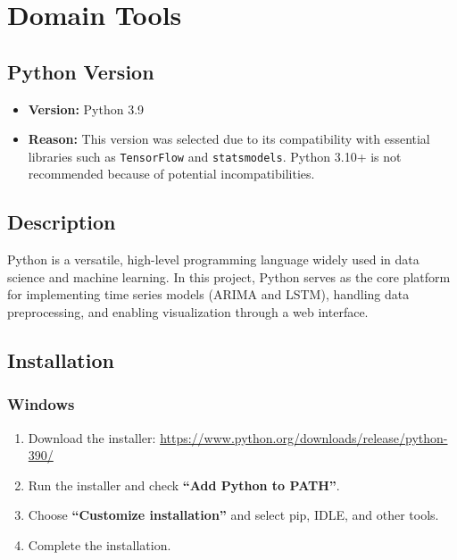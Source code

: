 %
%

\chapter{Domain Tools}

\section{Python Version}

\begin{itemize}
	\item \textbf{Version:} Python 3.9
	\item \textbf{Reason:} This version was selected due to its compatibility with essential libraries such as \texttt{TensorFlow} and \texttt{statsmodels}. Python 3.10+ is not recommended because of potential incompatibilities.
\end{itemize}

\section{Description}

Python is a versatile, high-level programming language widely used in data science and machine learning. In this project, Python serves as the core platform for implementing time series models (ARIMA and LSTM), handling data preprocessing, and enabling visualization through a web interface.

\section{Installation}

\subsection*{Windows}

\begin{enumerate}
	\item Download the installer: \url{https://www.python.org/downloads/release/python-390/}
	\item Run the installer and check \textbf{``Add Python to PATH''}.
	\item Choose \textbf{``Customize installation''} and select pip, IDLE, and other tools.
	\item Complete the installation.
\end{enumerate}


